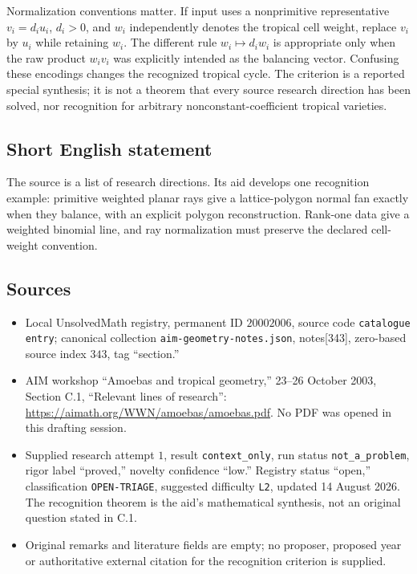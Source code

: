 \documentclass[11pt]{article}
\begin{document}
Normalization conventions matter. If input uses a nonprimitive representative \(v_i=d_i u_i\), \(d_i>0\), and \(w_i\) independently denotes the tropical cell weight, replace \(v_i\) by \(u_i\) while retaining \(w_i\). The different rule \(w_i\mapsto d_iw_i\) is appropriate only when the raw product \(w_iv_i\) was explicitly intended as the balancing vector. Confusing these encodings changes the recognized tropical cycle. The criterion is a reported special synthesis; it is not a theorem that every source research direction has been solved, nor recognition for arbitrary nonconstant-coefficient tropical varieties.
\subsection{Short English statement}
The source is a list of research directions. Its aid develops one recognition example: primitive weighted planar rays give a lattice-polygon normal fan exactly when they balance, with an explicit polygon reconstruction. Rank-one data give a weighted binomial line, and ray normalization must preserve the declared cell-weight convention.
\subsection{Sources}
\begin{itemize}
\item Local UnsolvedMath registry, permanent ID \(20002006\), source code \texttt{catalogue entry}; canonical collection \texttt{aim-geometry-notes.json}, notes[343], zero-based source index \(343\), tag ``section.''
\item AIM workshop ``Amoebas and tropical geometry,'' 23--26 October 2003, Section C.1, ``Relevant lines of research'': \url{https://aimath.org/WWN/amoebas/amoebas.pdf}. No PDF was opened in this drafting session.
\item Supplied research attempt \(1\), result \texttt{context\_only}, run status \texttt{not\_a\_problem}, rigor label ``proved,'' novelty confidence ``low.'' Registry status ``open,'' classification \texttt{OPEN-TRIAGE}, suggested difficulty \texttt{L2}, updated 14 August 2026. The recognition theorem is the aid's mathematical synthesis, not an original question stated in C.1.
\item Original remarks and literature fields are empty; no proposer, proposed year or authoritative external citation for the recognition criterion is supplied.
\end{itemize}
\end{document}
